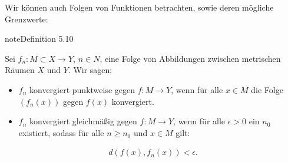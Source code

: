 \documentclass[letterpaper,10pt,english]{jupyterBook}
\begin{document}
Wir können auch Folgen von Funktionen betrachten, sowie deren mögliche Grenzwerte:
\label{stetigkeit/glm:definition-3}
\begin{sphinxadmonition}{note}{Definition 5.10}



Sei \(f_n: M \subset X \rightarrow Y\), \(n \in N\), eine Folge von Abbildungen zwischen metrischen Räumen \(X\) und \(Y\). Wir sagen:
\begin{itemize}
\item {} 
\(f_n\) konvergiert punktweise gegen \(f: M \rightarrow Y\), wenn für alle \(x \in M\) die Folge \((f_n(x))\) gegen \(f(x)\) konvergiert.

\item {} 
\(f_n\) konvergiert gleichmäßig gegen \(f: M \rightarrow Y\), wenn für alle \(\epsilon > 0\) ein \(n_0\) existiert, sodass für alle \(n \geq n_0\) und \(x \in M\) gilt:

\end{itemize}
\begin{equation*}
\begin{split} d(f(x),f_n(x)) < \epsilon.\end{split}
\end{equation*}\end{sphinxadmonition}
\end{document}
